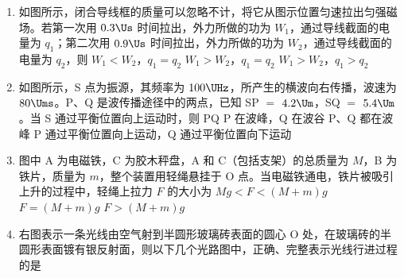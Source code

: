 \documentclass[\gkver]{gaokaozhenti}
\begin{document}
\begin{enumerate}

\item
如图所示，闭合导线框的质量可以忽略不计，将它从图示位置匀速拉出匀强磁场。若第一次用 $0.3\Us$ 时间拉出，外力所做的功为 $W_{1}$，通过导线截面的电量为 $q_{1}$；第二次用 $0.9\Us$ 时间拉出，外力所做的功为 $W_{2}$，通过导线截面的电量为 $q_{2}$，则
\onepicture[w=4.73cm]{}
{$W_{1} < W_{2}$，$q_{1} = q_{2}$}
{$W_{1} > W_{2}$，$q_{1} = q_{2}$}
{$W_{1} > W_{2}$，$q_{1} > q_{2}$}


\item
如图所示，S 点为振源，其频率为 $100\UHz$，所产生的横波向右传播，波速为 $80\Ums$。P、Q 是波传播途径中的两点，已知 SP $=$ $4.2\Um$，SQ $=$ $5.4\Um$。当 S 通过平衡位置向上运动时，则 PQ
\onepicture[w=4.25cm]{}
{P 在波峰，Q 在波谷}
{P、Q 都在波峰}
{P 通过平衡位置向上运动，Q 通过平衡位置向下运动}


\item
图中 A 为电磁铁，C 为胶木秤盘，A 和 C（包括支架）的总质量为 $M$，B 为铁片，质量为 $m$，整个装置用轻绳悬挂于 O 点。当电磁铁通电，铁片被吸引上升的过程中，轻绳上拉力 $F$ 的大小为
\onepicture[h=3.55cm]{}
{$Mg < F < (M + m)g$}
{$F = (M + m)g$}
{$F > (M + m)g$}


\item
右图表示一条光线由空气射到半圆形玻璃砖表面的圆心 O 处，在玻璃砖的半圆形表面镀有银反射面，则以下几个光路图中，正确、完整表示光线行进过程的是
\onepicture[w=3.05cm]{}
\fourchoices[answer=D, ispicture=true, hA=2.60cm, hB=2.60cm, hC=2.60cm, hD=2.60cm]
{}
{}
{}
{}


\end{enumerate}
\end{document}
